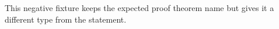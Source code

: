 This negative fixture keeps the expected proof theorem name but gives it a different type from the statement.
